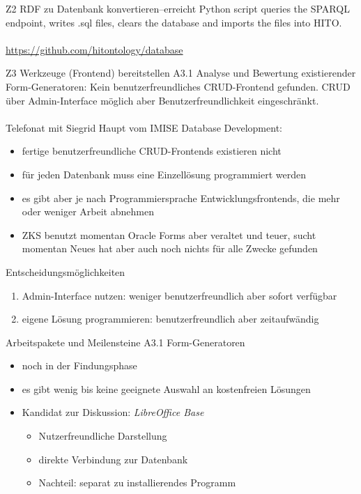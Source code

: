 \documentclass[aspectratio=169]{beamer}
\begin{document}
\begin{frame}{Z2 RDF zu Datenbank konvertieren--erreicht}
\url{}
Python script queries the SPARQL endpoint, writes .sql files, clears the database and imports the files into HITO.\\
~\\
\centering\url{https://github.com/hitontology/database}
\end{frame}

\begin{frame}{Z3 Werkzeuge (Frontend) bereitstellen}
A3.1 Analyse und Bewertung existierender Form-Generatoren: Kein benutzerfreundliches CRUD-Frontend gefunden.
CRUD über Admin-Interface möglich aber Benutzerfreundlichkeit eingeschränkt.\\
~\\
Telefonat mit Siegrid Haupt vom IMISE Database Development:\\
\begin{itemize}
\item fertige benutzerfreundliche CRUD-Frontends existieren nicht
\item für jeden Datenbank muss eine Einzellösung programmiert werden
\item es gibt aber je nach Programmiersprache Entwicklungsfrontends, die mehr oder weniger Arbeit abnehmen
\item ZKS benutzt momentan Oracle Forms aber veraltet und teuer, sucht momentan Neues hat aber auch noch nichts für alle Zwecke gefunden
\end{itemize}
\end{frame}

\begin{frame}{Entscheidungsmöglichkeiten}
\begin{enumerate}
\item Admin-Interface nutzen: weniger benutzerfreundlich aber sofort verfügbar
\item eigene Lösung programmieren: benutzerfreundlich aber zeitaufwändig
\end{enumerate}
\end{frame}

\iffalse
\begin{frame}{Arbeitspakete und Meilensteine A3.1 Form-Generatoren}
\begin{itemize}
\item noch in der Findungsphase
\item es gibt wenig bis keine geeignete Auswahl an kostenfreien Lösungen
\item Kandidat zur Diskussion: \emph{LibreOffice Base}
\begin{itemize}
  \item Nutzerfreundliche Darstellung
  \item direkte Verbindung zur Datenbank
  \item Nachteil: separat zu installierendes Programm
\end{itemize}
\end{itemize}
\end{frame}
\end{document}
